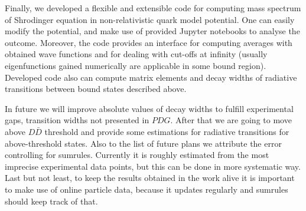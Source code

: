 Finally, we developed a flexible and extensible code for computing mass spectrum of Shrodinger equation in non-relativistic quark model potential. One can easily modify the potential, and make use of provided Jupyter notebooks to analyse the outcome. Moreover, the code provides an interface for computing averages with obtained wave functions and for dealing with cut-offs at infinity (usually eigenfunctions gained numerically are applicable in some bound region). Developed code also can compute matrix elements and decay widths of radiative transitions between bound states described above.

In future we will improve absolute values of decay widths to fulfill experimental gaps, transition widths not presented in $PDG$. After that we are going to move above $D\bar{D}$ threshold and provide some estimations for radiative transitions for above-threshold states. Also to the list of future plans we attribute the error controlling for sumrules. Currently it is roughly estimated from the most imprecise experimental data points, but this can be done in more systematic way. Last but not least, to keep the results obtained in the work alive it is important to make use of online particle data, because it updates regularly and sumrules should keep track of that.
